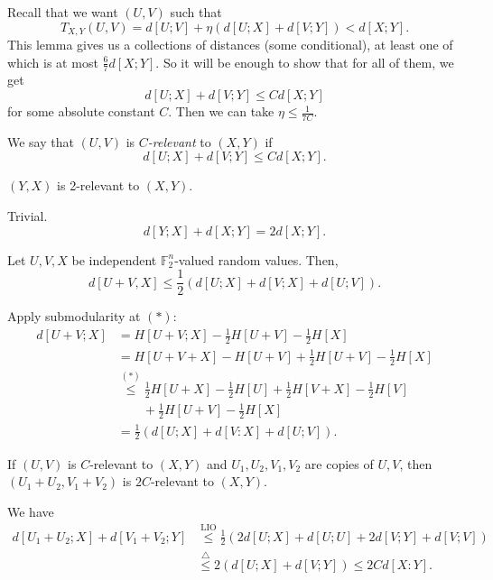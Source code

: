 \documentclass[12pt]{article}
\begin{document}
Recall that we want $(U, V)$ such that
\[
T_{X, Y}(U, V) = d[U; V] + \eta (d[U; X] + d[V; Y]) < d[X; Y].
\]
This lemma gives us a collections of distances (some conditional), at least one of which is at most $\frac 67 d[X; Y]$. So it will be enough to show that for all of them, we get
\[
	d[U; X] + d[V; Y] \leq C d[X; Y]
\]
for some absolute constant $C$. Then we can take $\eta \leq \frac 1 {7C}$.

\begin{definition}
	We say that $(U, V)$ is \emph{$C$-relevant} to $(X, Y)$ if
	\[
		d[U; X] + d[V; Y] \leq Cd[X; Y].
	\]
\end{definition}

\begin{lemma}
	$(Y, X)$ is 2-relevant to $(X, Y)$.
\end{lemma}

\begin{proofbox}
	Trivial.
	\[
		d[Y; X] + d[X; Y] = 2 d[X; Y].
	\]
\end{proofbox}

\begin{lemma}
	Let $U, V, X$ be independent $\mathbb{F}_2^{n}$-valued random values. Then,
	\[
		d[U + V, X] \leq \frac 12 \left( d[U; X] + d[V; X] + d[U; V] \right).
	\]
\end{lemma}

\begin{proofbox}
	Apply submodularity at $(\ast)$:
	\begin{align*}
		d[U + V; X] &= H[U + V; X] - \frac 12 H[U + V] - \frac 12 H[X] \\
			    &= H[U + V + X] - H[U + V] + \frac 12 H[U + V] - \frac 12 H[X] \\
			    &\overset{(\ast)}\leq \frac 12 H[U + X] - \frac 12 H[U] + \frac 12 H[V + X] - \frac 12 H[V] \\
			    & \qquad + \frac 12 H[U + V] - \frac 12 H[X] \\
			    &= \frac 12 (d[U; X] + d[V: X] + d[U; V]).
	\end{align*}
\end{proofbox}

\begin{corollary}
	If $(U, V)$ is $C$-relevant to $(X, Y)$ and $U_1, U_2, V_1, V_2$ are copies of $U, V$, then $(U_1 + U_2, V_1 + V_2)$ is $2C$-relevant to $(X, Y)$.
\end{corollary}

\begin{proofbox}
	We have
	\begin{align*}
		d[U_1+U_2;X] + d[V_1+V_2;Y] &\overset{\text{LIO}}\leq \frac 12 (2d[U; X] + d[U; U] + 2d[V; Y] + d[V; V]) \\
					    & \overset{\triangle}\leq 2 (d[U; X] + d[V; Y]) \leq 2 C d[X: Y].
	\end{align*}
\end{proofbox}
\end{document}
